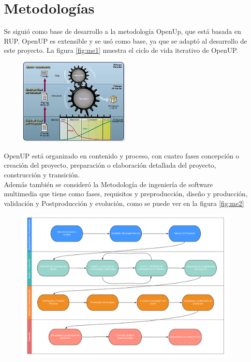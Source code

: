 \section{Metodologías}
Se siguió como base de desarrollo a la metodología OpenUp\cite{balduino2007introduction}, que está basada en RUP. 
OpenUP es extensible y se usó como base, ya que se adaptó al desarrollo de este proyecto.
La figura \ref{fig:me1} muestra el ciclo de vida iterativo de OpenUP.
\begin{figure}[H]
	\begin{center}
 		\includegraphics[width = 0.5\textwidth]{source/images/image70.png}
	\end{center} 
\end{figure}
OpenUP está organizado en contenido y proceso, con cuatro fases concepción o creación del proyecto, preparación o elaboración detallada del proyecto, construcción y transición.\\
Además también se consideró la Metodología de ingeniería de software multimedia que tiene como fases, requisitos y preproducción, diseño y producción, validación y 
Postproducción y evolución, como se puede ver en la figura \ref{fig:me2}
\begin{figure}[H]
	\begin{center}
 		\includegraphics[width = 1\textwidth]{source/images/image50.png}
	\end{center} 
\end{figure}
